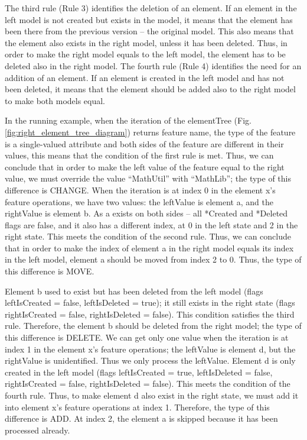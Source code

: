 The third rule (Rule 3) identifies the deletion of an element. If an element in the left model is not created but exists in the model, it means that the element has been there from the previous version -- the original model. This also means that the element also exists in the right model, unless it has been deleted. Thus, in order to make the right model equals to the left model, the element has to be deleted also in the right model. The fourth rule (Rule 4) identifies the need for an addition of an element. If an element is created in the left model and has not been deleted, it means that the element should be added also to the right model to make both models equal.

In the running example, when the iteration of the \textsf{elementTree} (Fig. \ref{fig:right_element_tree_diagram}) returns feature \textsf{name}, the type of the feature is a single-valued attribute and both sides of the feature are different in their values, this means that the condition of the first rule is met. Thus, we can conclude that in order to make the left value of the feature equal to the right value, we must override the value ``MathUtil'' with ``MathLib''; the type of this difference is \textsf{CHANGE}. When the iteration is at index 0 in the element \textsf{x}'s feature \textsf{operations}, we have two values: the \textsf{leftValue} is element \textsf{a}, and the \textsf{rightValue} is element \textsf{b}. As \textsf{a} exists
on both sides -- all \textsf{*Created} and \textsf{*Deleted} flags are false, and it also has a different index, at 0 in the left state and 2 in the right state. This meets the condition of the second rule. Thus, we can conclude that in order to make the index of element \textsf{a} in the right model equals its index in the left model, element \textsf{a} should be moved from index 2 to 0. Thus, the type of this difference is \textsf{MOVE}. 

Element \textsf{b} used to exist but has been deleted from the left model (flags \textsf{leftIsCreated} = false, \textsf{leftIsDeleted} = true); it still exists in the right state (flags \textsf{rightIsCreated} = false, \textsf{rightIsDeleted} = false). This condition satisfies the third rule. Therefore, the element \textsf{b} should be deleted from the right model; the type of this difference is \textsf{DELETE}. We can get only one value when the iteration is at index 1 in the element \textsf{x}'s feature \textsf{operations}; the \textsf{leftValue} is element \textsf{d}, but the \textsf{rightValue} is unidentified. Thus we only process the \textsf{leftValue}. Element \textsf{d} is only created in the left model (flags \textsf{leftIsCreated} = true, \textsf{leftIsDeleted} = false, \textsf{rightIsCreated} = false, \textsf{rightIsDeleted} = false). This meets the condition of the fourth rule. Thus, to make element \textsf{d} also exist in the right state, we must add it into element \textsf{x}'s feature \textsf{operations} at index 1. Therefore, the type of this difference is \textsf{ADD}. At index 2, the element \textsf{a} is skipped because it has been processed already. 

